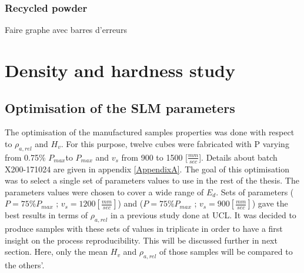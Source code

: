 \subsubsection{Recycled powder}
Faire graphe avec barres d'erreurs
 \begin{center}
\begin{table}[ht]
\noindent{}

\caption[Composition of recycled AlSi10Mg powder as a function of the date]{Composition of recycled AlSi10Mg powder as a function of the date}
\label{tab:compo}
\end{table}
 \end{center}

\section{Density and hardness study}
\subsection{Optimisation of the SLM parameters}
\label{Rparaopti}
The optimisation of the manufactured samples properties was done with respect to $\rho_{a,rel}$ and $H_v$. For this purpose, twelve cubes were fabricated with P varying from 0.75\% $P_{max} $to $P_{max}$ and $v_s$ from 900 to 1500 [$\frac{mm}{sec}$]. Details about batch X200-171024 are given in appendix \ref{AppendixA}. The goal of this optimisation was to select a single set of parameters values to use in the rest of the thesis. The parameters values were chosen to cover a wide range of $E_d$. Sets of parameters ($P=75\% P_{max}$ ; $v_s=1200 [\frac{mm}{sec}]$) and ($P=75\% P_{max}$ ; $v_s=900 [\frac{mm}{sec}]$) gave the best results in terms of $\rho_{a,rel}$ in a previous study done at UCL. It was decided to produce samples with these sets of values in triplicate in order to have a first insight on the process reproducibility. This will be discussed further in next section. Here, only the mean $H_v$ and $\rho_{a,rel}$ of those samples will be compared to the others'.\\

